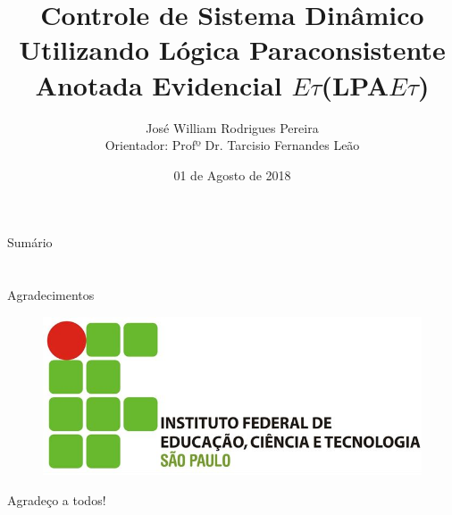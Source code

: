 \documentclass[handout,t]{beamer}
\title[]{
Controle de Sistema Dinâmico Utilizando Lógica Paraconsistente Anotada Evidencial $E\tau$(LPA$E\tau$)}
\date{01 de Agosto de 2018}
\author[José W. R. Pereira]
{
	José William Rodrigues Pereira\inst{1}\\
	\vspace{0.25cm}
	Orientador: Profº Dr. Tarcisio Fernandes Leão\inst{2}
}
\institute[INSTITUTO]
{
	\inst{1}%
	\url{josewrpereira@gmail.com}\\
	\vspace{0.25cm}
	\inst{2}%
	\url{leao@ifsp.edu.br}
\
}
\begin{document}
\frame{\titlepage}
\section[]{}
\begin{frame}{Sumário}
	\tableofcontents
\end{frame}













\section{}
  \begin{frame}{Agradecimentos}
    \begin{figure}[!htb]
      \center\includegraphics[scale=0.6]{./figuras/logo_IFSP.jpg}
    \end{figure}

    \centering

    \vspace{1cm}
    Agradeço a todos!
	
  \end{frame}
\end{document}
